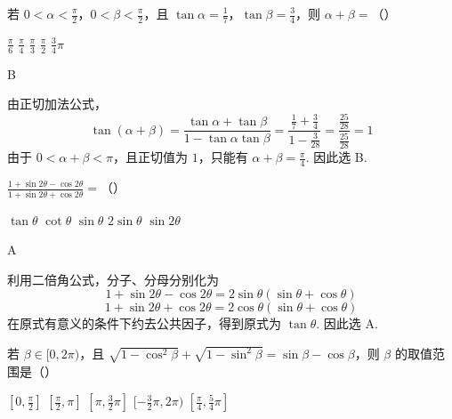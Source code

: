 \begin{problem}

若 \(0 < \alpha < \frac{\pi}{2}\)，\(0 < \beta < \frac{\pi}{2}\)，且 \(\tan \alpha = \frac{1}{7}\)，\(\tan \beta = \frac{3}{4}\)，则 \(\alpha + \beta =\)（\quad）

\choicesfive
    {\(\frac{\pi}{6}\)}
    {\(\frac{\pi}{4}\)}
    {\(\frac{\pi}{3}\)}
    {\(\frac{\pi}{2}\)}
    {\(\frac{3}{4}\pi\)}
\end{problem}

\begin{answer}
B
\end{answer}

\begin{solution}
由正切加法公式，
\[
\tan(\alpha+\beta)=\frac{\tan\alpha+\tan\beta}{1-\tan\alpha\tan\beta}
=\frac{\frac{1}{7}+\frac{3}{4}}{1-\frac{3}{28}}=\frac{\frac{25}{28}}{\frac{25}{28}}=1
\]
由于 \(0<\alpha+\beta<\pi\)，且正切值为 \(1\)，只能有 \(\alpha+\beta=\frac{\pi}{4}\). 因此选 B.
\end{solution}


\begin{problem}

\(\frac{1 + \sin 2\theta - \cos 2\theta}{1 + \sin 2\theta + \cos 2\theta} =\)（\quad）

\choicesfive
    {\(\tan\theta\)}
    {\(\cot\theta\)}
    {\(\sin\theta\)}
    {\(2\sin\theta\)}
    {\(\sin 2\theta\)}
\end{problem}

\begin{answer}
A
\end{answer}

\begin{solution}
利用二倍角公式，分子、分母分别化为
\[
1+\sin2\theta-\cos2\theta=2\sin\theta(\sin\theta+\cos\theta)
\]
\[
1+\sin2\theta+\cos2\theta=2\cos\theta(\sin\theta+\cos\theta)
\]
在原式有意义的条件下约去公共因子，得到原式为 \(\tan\theta\). 因此选 A.
\end{solution}


\begin{problem}

若 \(\beta \in [0, 2\pi)\)，且 \(\sqrt{1 - \cos^2\beta} + \sqrt{1 - \sin^2\beta} = \sin \beta - \cos \beta\)，则 \(\beta\) 的取值范围是（\quad）

\choicesfive
    {\([0, \frac{\pi}{2}]\)}
    {\([\frac{\pi}{2}, \pi]\)}
    {\([\pi, \frac{3}{2}\pi]\)}
    {\([-\frac{3}{2}\pi, 2\pi)\)}
    {\([\frac{\pi}{4}, \frac{5}{4}\pi]\)}
\end{problem}

